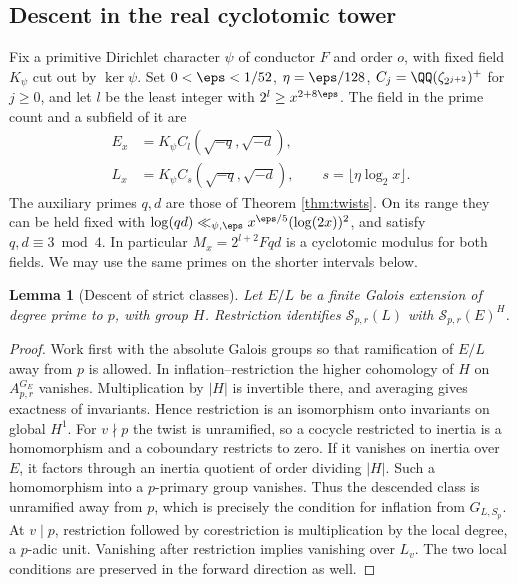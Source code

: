 \documentclass[a4paper,11pt]{article}
\newtheorem{lemma}[proposition]{Lemma}
\theoremstyle{definition}
\theoremstyle{remark}
\numberwithin{equation}{section}
\newcommand{\Sel}{\mathcal S}
\begin{document}
\subsection{Descent in the real cyclotomic tower}\label{nav:II-14}
Fix a primitive Dirichlet character \(\psi\) of conductor \(F\) and order \(o\), with fixed field \(K_\psi\) cut out by \(\ker\psi\). Set \(0<\eps<1/52\), \(\eta=\eps/128\), \(C_j=\QQ(\zeta_{2^{j+2}})^+\) for \(j\ge0\), and let \(l\) be the least integer with \(2^l\ge x^{2+8\eps}\). The field in the prime count and a subfield of it are
\[
 \begin{split}
  E_x&=K_\psi C_l(\sqrt{-q},\sqrt{-d}),\\
  L_x&=K_\psi C_s(\sqrt{-q},\sqrt{-d}),\qquad
          s=\lfloor\eta\log_2 x\rfloor .
 \end{split}
\]
The auxiliary primes \(q,d\) are those of Theorem \ref{thm:twists}. On its range they can be held fixed with \(\log(qd)\ll_{\psi,\eps}x^{\eps/5}(\log(2x))^2\), and satisfy \(q,d\equiv3\bmod4\). In particular \(M_x=2^{l+2}Fqd\) is a cyclotomic modulus for both fields. We may use the same primes on the shorter intervals below.

\begin{lemma}[Descent of strict classes]\label{lem:desc}
Let \(E/L\) be a finite Galois extension of degree prime to \(p\), with group \(H\). Restriction identifies \(\Sel_{p,r}(L)\) with \(\Sel_{p,r}(E)^H\).
\end{lemma}
\begin{proof}
Work first with the absolute Galois groups so that ramification of \(E/L\) away from \(p\) is allowed. In inflation--restriction the higher cohomology of \(H\) on \(A_{p,r}^{G_E}\) vanishes. Multiplication by \(|H|\) is invertible there, and averaging gives exactness of invariants. Hence restriction is an isomorphism onto invariants on global \(H^1\). For \(v\nmid p\) the twist is unramified, so a cocycle restricted to inertia is a homomorphism and a coboundary restricts to zero. If it vanishes on inertia over \(E\), it factors through an inertia quotient of order dividing \(|H|\). Such a homomorphism into a \(p\)-primary group vanishes. Thus the descended class is unramified away from \(p\), which is precisely the condition for inflation from \(G_{L,S_p}\). At \(v\mid p\), restriction followed by corestriction is multiplication by the local degree, a \(p\)-adic unit. Vanishing after restriction implies vanishing over \(L_v\). The two local conditions are preserved in the forward direction as well.
\end{proof}
\end{document}
